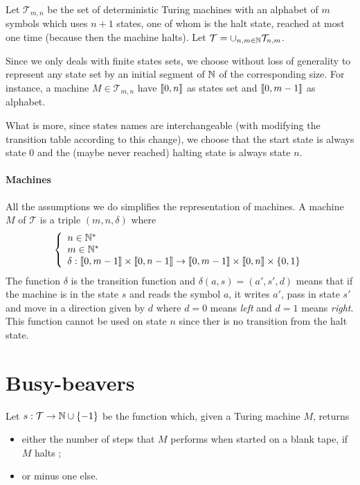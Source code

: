 \documentclass{report}
\begin{document}
 Let $\mathcal{T}_{m,n}$ be the set of deterministic Turing machines with an alphabet of $m$ symbols which uses $n + 1$ states, one of whom is the halt state, reached at most one time (because then the machine halts). Let  $\mathcal{T} = \cup_{n,m \in \mathbb{N}} \mathcal{T}_{n,m}$.

Since we only deals with finite states sets, we choose without loss of generality to represent any state set by an initial segment of $\mathbb{N}$ of the corresponding size. For instance, a machine $M \in \mathcal{T}_{m,n}$ have $\llbracket 0, n \rrbracket$ as states set and $\llbracket 0, m-1 \rrbracket$ as alphabet.

What is more, since states names are interchangeable (with modifying the transition table according to this change), we choose that the start state is always state $0$ and the (maybe never reached) halting state is always state $n$.



\paragraph{Machines}
All the assumptions we do simplifies the representation of machines. A machine $M$ of $\mathcal{T}$ is a triple $(m,n,\delta)$ where 
\[
\left \{
\begin{array}{l}
  n \in \mathbb{N}^*\\
  m \in \mathbb{N}^*\\
  \delta : \llbracket 0, m-1 \rrbracket \times \llbracket 0, n-1 \rrbracket \to \llbracket 0, m-1 \rrbracket \times \llbracket 0, n \rrbracket \times \{0,1\}
\end{array}
\right .
\]
The function $\delta$ is the transition function and $\delta(a, s) = (a', s', d)$ means that if the machine is in the state $s$ and reads the symbol $a$, it writes $a'$, pass in state $s'$ and move in a direction given by $d$ where $d = 0$ means \emph{left} and $d = 1$ means \emph{right}. This function cannot be used on state $n$ since ther is no transition from the halt state.


\section{Busy-beavers}
\label{sec:bb}


\begin{Def}[$s$ function]
  
\end{Def}
Let $s : \mathcal{T} \to \mathbb{N} \cup \{-1\}$ be the function which, given a Turing machine $M$, returns
\begin{itemize}
\item either the number of steps that $M$ performs when started on a blank tape, if $M$ halts ;
\item or minus one else.
\end{itemize}
\end{document}
